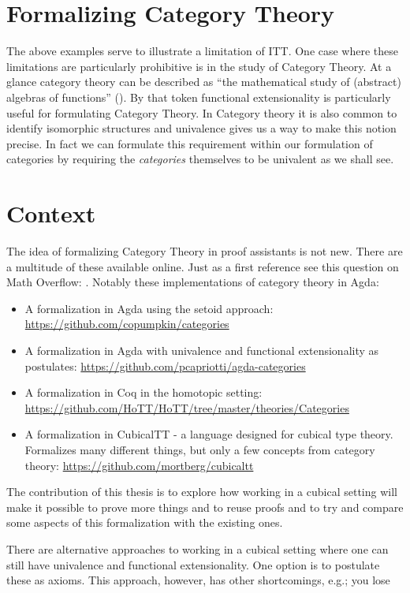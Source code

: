 \section{Formalizing Category Theory}
%
The above examples serve to illustrate a limitation of ITT. One case where these
limitations are particularly prohibitive is in the study of Category Theory. At
a glance category theory can be described as ``the mathematical study of
(abstract) algebras of functions'' (\cite{awodey-2006}). By that token
functional extensionality is particularly useful for formulating Category
Theory. In Category theory it is also common to identify isomorphic structures
and univalence gives us a way to make this notion precise. In fact we can
formulate this requirement within our formulation of categories by requiring the
\emph{categories} themselves to be univalent as we shall see.

\section{Context}
\label{sec:context}
%
The idea of formalizing Category Theory in proof assistants is not new. There
are a multitude of these available online. Just as a first reference see this
question on Math Overflow: \cite{mo-formalizations}. Notably these
implementations of category theory in Agda:
%
\begin{itemize}
\item
  A formalization in Agda using the setoid approach:
  \url{https://github.com/copumpkin/categories}
\item
  A formalization in Agda with univalence and functional
  extensionality as postulates:
  \url{https://github.com/pcapriotti/agda-categories}
\item
  A formalization in Coq in the homotopic setting:
  \url{https://github.com/HoTT/HoTT/tree/master/theories/Categories}
\item
  A formalization in CubicalTT - a language designed for cubical type theory.
  Formalizes many different things, but only a few concepts from category
  theory:
  \url{https://github.com/mortberg/cubicaltt}
\end{itemize}
%
The contribution of this thesis is to explore how working in a cubical setting
will make it possible to prove more things and to reuse proofs and to try and
compare some aspects of this formalization with the existing ones.

There are alternative approaches to working in a cubical setting where one can
still have univalence and functional extensionality. One option is to postulate
these as axioms. This approach, however, has other shortcomings, e.g.; you lose


